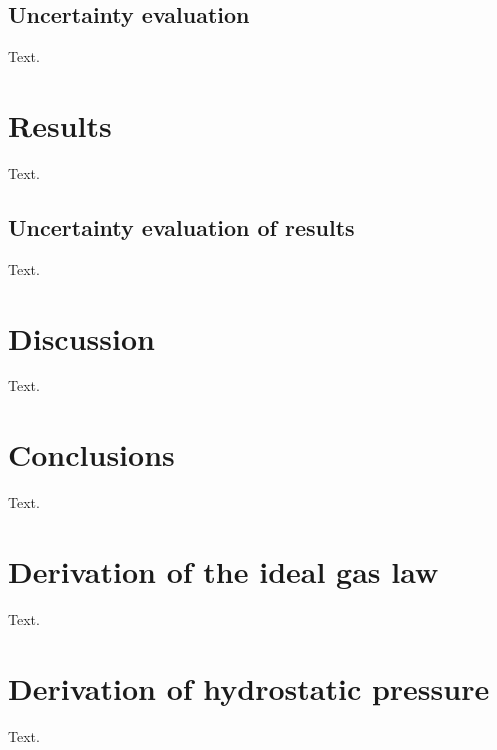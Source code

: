 \documentclass[a4paper,11pt, twocolumn]{article}
\begin{document}
\subsection{Uncertainty evaluation}
Text.


\section{Results}
Text.

\subsection{Uncertainty evaluation of results}
Text.

\section{Discussion}
Text.

\section{Conclusions}
Text.

\appendix
\section{Derivation of the ideal gas law}
Text. %

\section{Derivation of hydrostatic pressure}
Text. %
\end{document}
